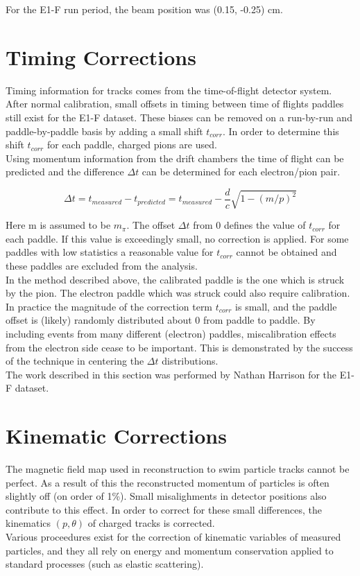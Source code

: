 For the E1-F run period, the beam position was (0.15, -0.25) cm.  

\section{Timing Corrections}
Timing information for tracks comes from the time-of-flight detector system.  After normal calibration, small offsets in timing between time of flights paddles still exist for the E1-F dataset.  These biases can be removed on a run-by-run and paddle-by-paddle basis by adding a small shift $t_{corr}$.  In order to determine this shift $t_{corr}$ for each paddle, charged pions are used.  \\

Using momentum information from the drift chambers the time of flight can be predicted and the difference $\Delta t$ can be determined for each electron/pion pair. 

\begin{equation}
	\Delta t = t_{measured} - t_{predicted} = t_{measured} - \frac{d}{c} \sqrt{1-(m/p)^2} 
\end{equation} 

Here m is assumed to be $m_{\pi}$.  The offset $\Delta t$ from 0 defines the value of $t_{corr}$ for each paddle.  If this value is exceedingly small, no correction is applied.  For some paddles with low statistics a reasonable value for $t_{corr}$ cannot be obtained and these paddles are excluded from the analysis.  \\

In the method described above, the calibrated paddle is the one which is struck by the pion.  The electron paddle which was struck could also require calibration.  In practice the magnitude of the correction term $t_{corr}$ is small, and the paddle offset is (likely) randomly distributed about 0 from paddle to paddle.  By including events from many different (electron) paddles, miscalibration effects from the electron side cease to be important.  This is demonstrated by the success of the technique in centering the $\Delta t$ distributions.  \\

The work described in this section was performed by Nathan Harrison for the E1-F dataset.

\section{Kinematic Corrections}
The magnetic field map used in reconstruction to swim particle tracks cannot be perfect.  As a result of this the reconstructed momentum of particles is often slightly off (on order of 1\%).  Small misalighments in detector positions also contribute to this effect.  In order to correct for these small differences, the kinematics $(p, \theta)$ of charged tracks is corrected. \\

Various proceedures exist for the correction of kinematic variables of measured particles, and they all rely on energy and momentum conservation applied to standard processes (such as elastic scattering).  
